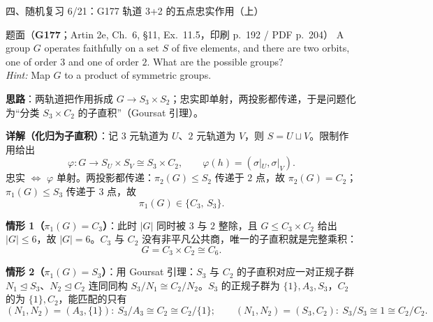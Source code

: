 \documentclass[aspectratio=169,10pt,fontset=none]{ctexbeamer}
\newcommand{\ex}[1]{\textcolor{accent}{\footnotesize\bfseries #1}}
\newcommand{\key}[1]{\textcolor{ink}{\bfseries #1}}
\begin{document}
\begin{frame}[t]{四、随机复习 6/21：G177 轨道 3+2 的五点忠实作用（上）}
\label{ex:G177}
\scriptsize
\begin{block}{\footnotesize 题面（\ex{G177}；Artin 2e, Ch.~6, §11, Ex.~11.5，印刷 p.~192 / PDF p.~204）}
A group $G$ operates faithfully on a set $S$ of five elements, and there are two orbits, one of order $3$ and one of order $2$. What are the possible groups?\\
\textit{Hint:} Map $G$ to a product of symmetric groups.
\end{block}
\key{思路}：两轨道把作用拆成 $G\to S_3\times S_2$；忠实即单射，两投影都传递，于是问题化为“分类 $S_3\times C_2$ 的子直积”（Goursat 引理）。

\key{详解（化归为子直积）}：记 $3$ 元轨道为 $U$、$2$ 元轨道为 $V$，则 $S=U\sqcup V$。限制作用给出
\[ \varphi:G\longrightarrow S_U\times S_V\cong S_3\times C_2,\qquad \varphi(h)=(\sigma|_U,\sigma|_V). \]
忠实 $\iff$ $\varphi$ 单射。两投影都传递：$\pi_2(G)\le S_2$ 传递于 $2$ 点，故 $\pi_2(G)=C_2$；$\pi_1(G)\le S_3$ 传递于 $3$ 点，故
\[ \pi_1(G)\in\{C_3,\,S_3\}. \]

\key{情形 1（$\pi_1(G)=C_3$）}：此时 $|G|$ 同时被 $3$ 与 $2$ 整除，且 $G\le C_3\times C_2$ 给出 $|G|\le 6$，故 $|G|=6$。$C_3$ 与 $C_2$ 没有非平凡公共商，唯一的子直积就是完整乘积：
\[ G=C_3\times C_2\cong C_6. \]

\key{情形 2（$\pi_1(G)=S_3$）}：用 Goursat 引理：$S_3$ 与 $C_2$ 的子直积对应一对正规子群 $N_1\trianglelefteq S_3$、$N_2\trianglelefteq C_2$ 连同同构 $S_3/N_1\cong C_2/N_2$。$S_3$ 的正规子群为 $\{1\},A_3,S_3$，$C_2$ 的为 $\{1\},C_2$，能匹配的只有
\[ (N_1,N_2)=(A_3,\{1\}):\ S_3/A_3\cong C_2\cong C_2/\{1\};\qquad (N_1,N_2)=(S_3,C_2):\ S_3/S_3\cong 1\cong C_2/C_2. \]
\end{frame}
\end{document}
